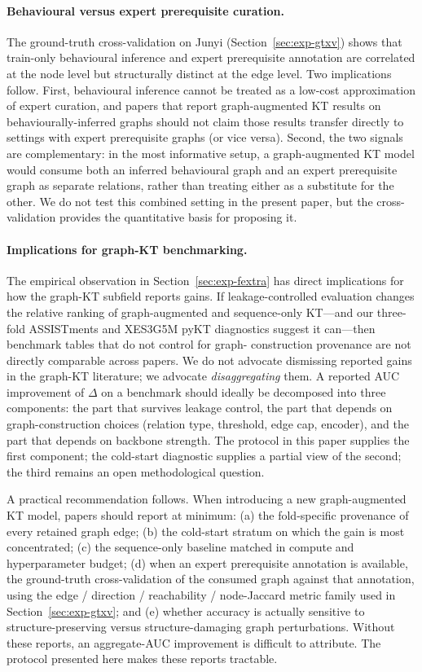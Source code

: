 \documentclass[runningheads]{llncs}
\begin{document}
\paragraph{Behavioural versus expert prerequisite curation.}
The ground-truth cross-validation on Junyi
(Section~\ref{sec:exp-gtxv}) shows that train-only behavioural
inference and expert prerequisite annotation are correlated at the
node level but structurally distinct at the edge level. Two
implications follow. First, behavioural inference cannot be treated
as a low-cost approximation of expert curation, and papers that
report graph-augmented KT results on behaviourally-inferred graphs
should not claim those results transfer directly to settings with
expert prerequisite graphs (or vice versa). Second, the two signals
are complementary: in the most informative setup, a graph-augmented
KT model would consume both an inferred behavioural graph and an
expert prerequisite graph as separate relations, rather than treating
either as a substitute for the other. We do not test this combined
setting in the present paper, but the cross-validation provides the
quantitative basis for proposing it.
\paragraph{Implications for graph-KT benchmarking.}
The empirical observation in Section~\ref{sec:exp-fextra} has direct
implications for how the graph-KT subfield reports gains. If
leakage-controlled evaluation changes the relative ranking of
graph-augmented and sequence-only KT---and our three-fold ASSISTments and XES3G5M pyKT diagnostics suggest it can---then benchmark tables that do not control for graph-
construction provenance are not directly comparable across papers. We
do not advocate dismissing reported gains in the graph-KT literature;
we advocate \emph{disaggregating} them. A reported AUC improvement of
$\Delta$ on a benchmark should ideally be decomposed into three
components: the part that survives leakage control, the part that
depends on graph-construction choices (relation type, threshold, edge
cap, encoder), and the part that depends on backbone strength. The
protocol in this paper supplies the first component; the cold-start
diagnostic supplies a partial view of the second; the third remains an
open methodological question.

A practical recommendation follows. When introducing a new
graph-augmented KT model, papers should report at minimum: (a) the
fold-specific provenance of every retained graph edge; (b) the
cold-start stratum on which the gain is most concentrated; (c) the
sequence-only baseline matched in compute and hyperparameter budget;
(d) when an expert prerequisite annotation is available, the
ground-truth cross-validation of the consumed graph against that
annotation, using the edge / direction / reachability / node-Jaccard
metric family used in Section~\ref{sec:exp-gtxv}; and (e) whether
accuracy is actually sensitive to structure-preserving versus
structure-damaging graph perturbations. Without these reports, an
aggregate-AUC improvement is difficult to attribute. The protocol
presented here makes these reports tractable.
\end{document}
